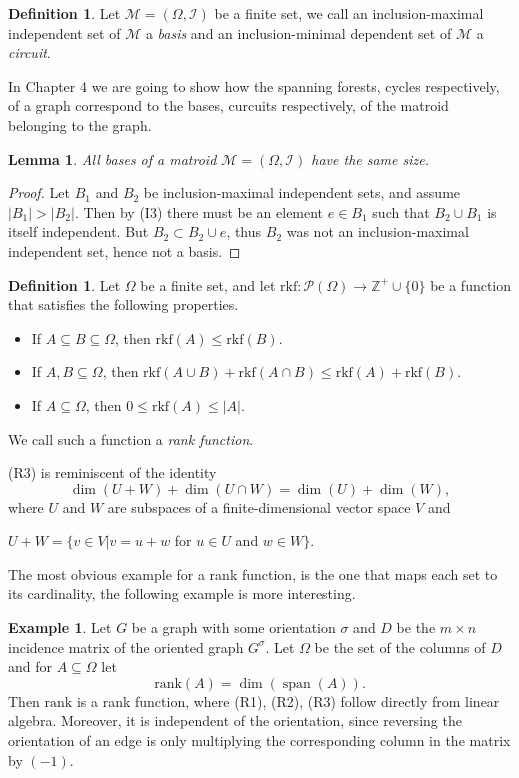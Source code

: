 \documentclass[12pt,a4paper, twoside, autooneside=false]{scrartcl}
\newtheorem{lemma}[theorem]{Lemma}
\theoremstyle{definition}
\newtheorem{definition}[theorem]{Definition}
\newtheorem{beispiel}[theorem]{Example}
\theoremstyle{remark}
\numberwithin{equation}{section}
\DeclareMathOperator{\spn}{span}
\newcommand{\M}{\mathcal{M}} %
\begin{document}
\begin{definition}
Let $\M = (\Omega, \mathcal{I})$ be a finite set, we call an inclusion-maximal independent set of $\M$ a \textit{basis} and an inclusion-minimal dependent set of $\M$ a \textit{circuit}.
\end{definition}
In Chapter 4 we are going to show how the spanning forests, cycles respectively, of a graph correspond to the bases, curcuits respectively, of the matroid belonging to the graph.
\begin{lemma}
All bases of a matroid $\M = (\Omega, \mathcal{I})$ have the same size. 
\end{lemma}
\begin{proof}
Let $B_1$ and $B_2$ be inclusion-maximal independent sets, and assume $|B_1| > |B_2|$. Then by (I3) there must be an element $e \in B_1$ such that $B_2 \cup B_1$ is itself independent. But $B_2 \subset B_2 \cup e$, thus $B_2$ was not an inclusion-maximal independent set, hence not a basis. 
\end{proof}
\begin{definition}
Let $\Omega$ be a finite set, and let $\mathrm{rkf}: \mathcal{P}(\Omega) \to \mathbb{Z}^+ \cup \{0\}$ be a function that satisfies the following properties.
\begin{itemize}
\item[(R1)] If $A \subseteq B \subseteq \Omega$, then $\mathrm{rkf}(A) \leq \mathrm{rkf}(B)$.
\item[(R2)] If $A,B \subseteq \Omega$, then $\mathrm{rkf}(A \cup B) + \mathrm{rkf}(A \cap B) \leq \mathrm{rkf}(A) + \mathrm{rkf}(B)$.
\item[(R3)] If $A \subseteq \Omega$, then $0 \leq \mathrm{rkf}(A) \leq |A|$. 
\end{itemize}
We call such a function a \textit{rank function}. 
\end{definition}
(R3) is reminiscent of the identity 
\[
\dim( U + W) + \dim(U \cap W) = \dim(U) + \dim(W),
\]
where $U$ and $W$ are subspaces of a finite-dimensional vector space $V$ and \begin{center} $U + W = \{v \in V | v = u + w $ for $u \in U$ and $w \in W\}$.\end{center}
The most obvious example for a rank function, is the one that maps each set to its cardinality, the following example is more interesting.
\begin{beispiel}
Let $G$ be a graph with some orientation $\sigma$ and $D$ be the $m \times n$ incidence matrix of the oriented graph $G^\sigma$. Let $\Omega$ be the set of the columns of $D$ and for $A \subseteq \Omega$ let 
\[
\mathrm{rank}(A) = \dim(\spn(A)).
\]
Then $\mathrm{rank}$ is a rank function, where (R1), (R2), (R3) follow directly from linear algebra. Moreover, it is independent of the orientation, since reversing the orientation of an edge is only multiplying the corresponding column in the matrix by $(-1)$.
\end{beispiel}
\end{document}
